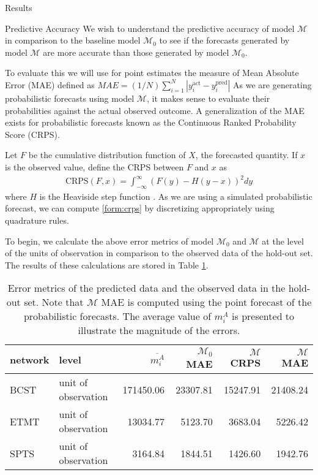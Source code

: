 \begin{chapter}{Results}
  \begin{section}{Predictive Accuracy}
    We wish to understand the predictive accuracy of model $\mathcal{M}$ in comparison
    to the baseline model $\mathcal{M}_0$ to see if the forecasts generated by model $\mathcal{M}$ are more
    accurate than those generated by model $\mathcal{M}_0$.

    To evaluate this we will use for point estimates the measure of Mean Absolute Error (MAE)
    defined as $MAE = (1/ N)\sum_{i=1}^N|y_i^{\text{act}} - y_i^{\text{pred}}|$
    As we are generating probabilistic forecasts using model $\mathcal{M}$, it makes
    sense to evaluate their probabilities against the actual observed outcome.
    A generalization of the MAE exists for probabilistic forecasts known as the Continuous
    Ranked Probability Score (CRPS).

    Let $F$ be the cumulative distribution function of $X$, the forecasted quantity.
    If $x$ is the observed value, define the CRPS between $F$ and $x$ as
    \begin{align}\label{form:crps}
      \text{CRPS}(F, x) = \int_{-\infty}^{\infty}\left(F(y) - H(y - x)\right)^2dy
    \end{align}
    where $H$ is the Heaviside step function \cite{crps}.
    As we are using a simulated probabilistic forecast, we can compute \ref{form:crps}
    by discretizing appropriately using quadrature rules.

    To begin, we calculate the above error metrics of model $\mathcal{M}_0$ and $\mathcal{M}$
    at the level of the units of observation
    in comparison to the observed data of the hold-out set. The results of these calculations are stored
    in Table \ref{tab:uniterror}.

    \begin{table}[h!]
      \centering
        \begin{tabular}{llrrrr}
          network & level & $\overline{m_i^A}$ & $\mathcal{M}_0$ MAE & $\mathcal{M}$ CRPS & $\mathcal{M}$ MAE \\
          \hline
          BCST & unit of observation & 171450.06 & 23307.81 & 15247.91 & 21408.24 \\
          ETMT & unit of observation & 13034.77 & 5123.70 & 3683.04 & 5226.42 \\
          SPTS & unit of observation & 3164.84 & 1844.51 & 1426.60 & 1942.76
        \end{tabular}
      \caption{Error metrics of the predicted data and the observed data in the hold-out set. Note that
      $\mathcal{M}$ MAE is computed using the point forecast of the probabilistic forecasts. The average
      value of $m_i^A$ is presented to illustrate the magnitude of the errors.}\label{tab:uniterror}
    \end{table}


\end{section}
\end{chapter}
